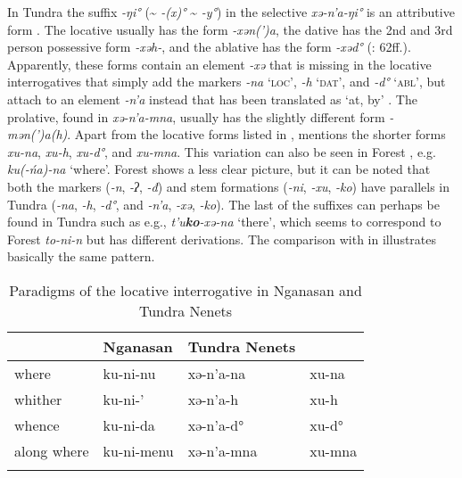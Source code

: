 In Tundra  the suffix \textit{-ŋi°} ({\textasciitilde} \textit{-(x)°} {\textasciitilde} \textit{-y°}) in the selective  \textit{xə-n’a-ŋi°} is an attributive form \citep[52]{Nikolaeva2014}. The locative usually has the form \textit{-xən(’)a}, the dative has the 2nd and 3rd person possessive form \textit{-xəh-}, and the ablative has the form \textit{-xəd°} (\citealt{Nikolaeva2014}: 62ff.). Apparently, these forms contain an element \textit{-xə} that is missing in the locative interrogatives that simply add the  markers \textit{-na} ‘\textsc{loc}’, \textit{-h} ‘\textsc{dat}’, and \textit{-d°} ‘\textsc{abl}’, but attach to an element \textit{-n’a} instead that has been translated as ‘at, by’ \citep[50]{Nikolaeva2014}. The prolative, found in \textit{xə-n’a-mna}, usually has the slightly different form \textit{-mən(’)a(h)}. Apart from the locative forms listed in , \citet[50]{Nikolaeva2014} mentions the shorter forms \textit{xu-na}, \textit{xu-h}, \textit{xu-d°}, and \textit{xu-mna}. This variation can also be seen in Forest , e.g. \textit{ku(-ńa)-na} ‘where’. Forest  shows a less clear picture, but it can be noted that both the  markers (\textit{-n}, \textit{-ʔ}, \textit{-}\textit{đ}) and stem formations (\textit{-ni}, \textit{-xu}, \textit{-ko}) have parallels in Tundra  (\textit{-na}, \textit{-h}, \textit{-d°}, and \textit{-n’a}, \textit{-xə}, \textit{-ko}). The last of the suffixes can perhaps be found in Tundra   such as e.g., \textit{t’u}\textbf{\textit{ko}}\textit{-xə-na} ‘there’, which seems to correspond to Forest  \textit{to-ni-n} but has different derivations. The comparison with  in  illustrates basically the same pattern.

\begin{table}
\caption{Paradigms of the locative interrogative in Nganasan and Tundra Nenets}
\label{tab:ural:9}

\begin{tabularx}{\textwidth}{XXXX}
\lsptoprule
& \textbf{Nganasan} & \textbf{Tundra Nenets} & \\
\midrule
where & ku-ni-nu & xə-n’a-na & xu-na\\
whither & ku-ni-’ & xə-n’a-h & xu-h\\
whence & ku-ni-da & xə-n’a-d° & xu-d°\\
along where & ku-ni-menu & xə-n’a-mna & xu-mna\\
\lspbottomrule
\end{tabularx}
\end{table}

